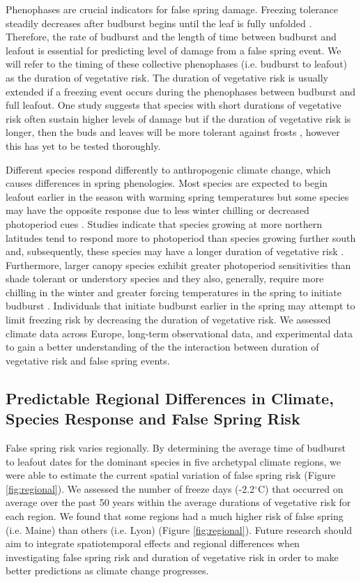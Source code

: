 \documentclass{article}\usepackage[]{graphicx}\usepackage[]{color}
\begin{document}
Phenophases are crucial indicators for false spring damage. Freezing tolerance steadily decreases after budburst begins until the leaf is fully unfolded \citep{Lenz2016}. Therefore, the rate of budburst and the length of time between budburst and leafout is essential for predicting level of damage from a false spring event. We will refer to the timing of these collective phenophases (i.e. budburst to leafout) as the duration of vegetative risk. The duration of vegetative risk is usually extended if a freezing event occurs during the phenophases between budburst and full leafout. One study suggests that species with short durations of vegetative risk often sustain higher levels of damage but if the duration of vegetative risk is longer, then the buds and leaves will be more tolerant against frosts \citep{Augspurger2009}, however this has yet to be tested thoroughly. 

Different species respond differently to anthropogenic climate change, which causes differences in spring phenologies. Most species are expected to begin leafout earlier in the season with warming spring temperatures but some species may have the opposite response due to less winter chilling or decreased photoperiod cues \citep{Cleland2006, Yu2010, Xin2016}. Studies indicate that species growing at more northern latitudes tend to respond more to photoperiod than species growing further south and, subsequently, these species may have a longer duration of vegetative risk \citep {Partanen2004, Viheraaarnio2006, Caffarra2011}. Furthermore, larger canopy species exhibit greater photoperiod sensitivities than shade tolerant or understory species \citep{Basler2012} and they also, generally, require more chilling in the winter and greater forcing temperatures in the spring to initiate budburst \citep{Laube2013}. Individuals that initiate budburst earlier in the spring may attempt to limit freezing risk by decreasing the duration of vegetative risk. We assessed climate data across Europe, long-term observational data, and experimental data to gain a better understanding of the the interaction between duration of vegetative risk and false spring events.  

\subsection {Predictable Regional Differences in Climate, Species Response and False Spring Risk}
False spring risk varies regionally. By determining the average time of budburst to leafout dates for the dominant species in five archetypal climate regions, we were able to estimate the current spatial variation of false spring risk (Figure \ref{fig:regional}). We assessed the number of freeze days (-2.2$^{\circ}$C) \citep{Schwartz1993} that occurred on average over the past 50 years within the average durations of vegetative risk for each region. We found that some regions had a much higher risk of false spring (i.e. Maine) than others (i.e. Lyon) (Figure \ref{fig:regional}). Future research should aim to integrate spatiotemporal effects and regional differences when investigating false spring risk and duration of vegetative risk in order to make better predictions as climate change progresses.
\end{document}
